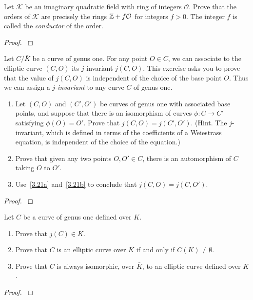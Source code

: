 \documentclass[12pt,reqno]{amsart}
\begin{document}
\begin{exe}\label{3.20}
Let $\mathcal{K}$ be an imaginary quadratic field with ring of integers $\mathcal{O}$.  Prove that the orders of $\mathcal{K}$ are precisely the rings ${\mathbb Z}+f\mathcal{O}$ for integers $f>0$. The integer $f$ is called the \emph{conductor} of the order.
\begin{proof}\label{s3.20}

\end{proof} 
\end{exe} 

\begin{exe}\label{3.21}
Let $C/\bar{K}$ be a curve of genus one.  For any point $O \in C$, we can associate to the elliptic curve $(C, O)$ its $j$-invariant $j(C, O)$.  This exercise asks you to prove that the value of $j(C, O)$ is independent of the choice of the base point $O$.  Thus we can assign a \emph{$j$-invariant} to any curve $C$ of genus one.
\begin{enumerate}
\item\label{3.21a}
Let $(C, O)$ and $(C', O')$ be curves of genus one with associated base points, and suppose that there is an isomorphism of curves $\phi: C \to C'$ satisfying $\phi(O)=O'$.  Prove that $j(C, O)=j(C', O')$.  (Hint.  The $j$-invariant, which is defined in terms of the coefficients of a Weiestrass equation, is independent of the choice of the equation.)
\item\label{3.21b}
Prove that given any two points $O, O'\in C$, there is an automorphism of $C$ taking $O$ to $O'$.
\item\label{3.21c}
Use~\ref{3.21a} and~\ref{3.21b} to conclude that $j(C, O)=j(C, O')$.
\end{enumerate}
\begin{proof}\label{s3.21}

\end{proof} 
\end{exe} 

\begin{exe}\label{3.22}
Let $C$ be a curve of genus one defined over $K$.
\begin{enumerate}
\item
Prove that $j(C)\in K$.
\item
Prove that $C$ is an elliptic curve over $K$ if and only if $C(K)\neq \emptyset$.
\item
Prove that $C$ is always isomorphic, over $\bar{K}$, to an elliptic curve defined over $K$.
\end{enumerate}
\begin{proof}\label{s3.22}

\end{proof} 
\end{exe} 
\end{document}
